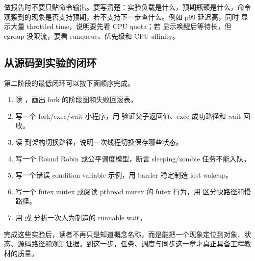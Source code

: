 做报告时不要只贴命令输出。要写清楚：实验负载是什么，预期瓶颈是什么，命令观察到的现象是否支持预期，若不支持下一步查什么。例如 p99 延迟高，同时  显示大量 throttled time，说明要先看 CPU quota；若  显示唤醒后等待长，但 cgroup 没限流，要看 runqueue、优先级和 CPU affinity。

\subsection{从源码到实验的闭环}

第二阶段的最低闭环可以按下面顺序完成。

\begin{enumerate}
\tightlist
\item 读 ，画出 fork 的阶段图和失败回滚表。
\item 写一个 fork/exec/wait 小程序，用  验证父子返回值、exec 成功路径和 wait 回收。
\item 读  到架构切换路径，说明一次线程切换保存哪些状态。
\item 写一个 Round Robin 或公平调度模型，断言 sleeping/zombie 任务不能入队。
\item 写一个错误 condition variable 示例，用 barrier 稳定制造 lost wakeup。
\item 写一个 futex mutex 或阅读 pthread mutex 的 futex 行为，用  区分快路径和慢路径。
\item 用  或  分析一次人为制造的 runnable wait。
\end{enumerate}

完成这些实验后，读者不再只是知道概念名称，而是能把一个现象定位到对象、状态、源码路径和观测证据。到这一步，任务、调度与同步这一章才真正具备工程教材的质量。
